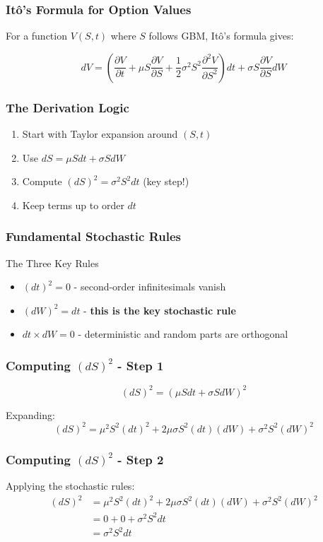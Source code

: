 \documentclass[aspectratio=169]{beamer}
\begin{document}
\begin{frame}
\frametitle{Itô's Formula for Option Values}
For a function \(V(S,t)\) where \(S\) follows GBM, Itô's formula gives:

\[dV = \left(\frac{\partial V}{\partial t} + \mu S \frac{\partial V}{\partial S} + \frac{1}{2}\sigma^2 S^2 \frac{\partial^2 V}{\partial S^2}\right) dt + \sigma S \frac{\partial V}{\partial S} dW\]
\end{frame}

\begin{frame}
\frametitle{The Derivation Logic}
\begin{enumerate}
\item Start with Taylor expansion around \((S,t)\)
\item Use \(dS = \mu S dt + \sigma S dW\)
\item Compute \((dS)^2 = \sigma^2 S^2 dt\) (key step!)
\item Keep terms up to order \(dt\)
\end{enumerate}
\end{frame}

\begin{frame}
\frametitle{Fundamental Stochastic Rules}
\begin{block}{The Three Key Rules}
\begin{itemize}
\item \((dt)^2 = 0\) - second-order infinitesimals vanish
\item \((dW)^2 = dt\) - \textbf{this is the key stochastic rule}
\item \(dt \times dW = 0\) - deterministic and random parts are orthogonal
\end{itemize}
\end{block}
\end{frame}

\begin{frame}
\frametitle{Computing \((dS)^2\) - Step 1}
\[(dS)^2 = (\mu S dt + \sigma S dW)^2\]

Expanding:
\[(dS)^2 = \mu^2 S^2 (dt)^2 + 2\mu\sigma S^2 (dt)(dW) + \sigma^2 S^2 (dW)^2\]
\end{frame}

\begin{frame}
\frametitle{Computing \((dS)^2\) - Step 2}
Applying the stochastic rules:
\begin{align}
(dS)^2 &= \mu^2 S^2 (dt)^2 + 2\mu\sigma S^2 (dt)(dW) + \sigma^2 S^2 (dW)^2 \\
&= 0 + 0 + \sigma^2 S^2 dt \\
&= \sigma^2 S^2 dt
\end{align}
\end{frame}
\end{document}
